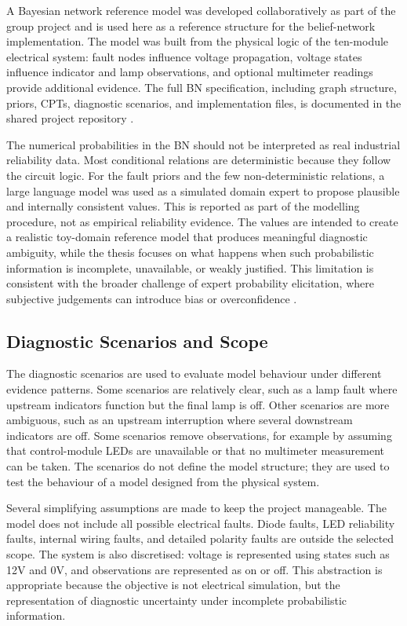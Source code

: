 \documentclass[runningheads]{llncs}
\begin{document}
A Bayesian network reference model was developed collaboratively as part of the group project and is used here as a reference structure for the belief-network implementation. The model was built from the physical logic of the ten-module electrical system: fault nodes influence voltage propagation, voltage states influence indicator and lamp observations, and optional multimeter readings provide additional evidence. The full BN specification, including graph structure, priors, CPTs, diagnostic scenarios, and implementation files, is documented in the shared project repository \cite{BNRepository2026}.

The numerical probabilities in the BN should not be interpreted as real industrial reliability data. Most conditional relations are deterministic because they follow the circuit logic. For the fault priors and the few non-deterministic relations, a large language model was used as a simulated domain expert to propose plausible and internally consistent values. This is reported as part of the modelling procedure, not as empirical reliability evidence. The values are intended to create a realistic toy-domain reference model that produces meaningful diagnostic ambiguity, while the thesis focuses on what happens when such probabilistic information is incomplete, unavailable, or weakly justified. This limitation is consistent with the broader challenge of expert probability elicitation, where subjective judgements can introduce bias or overconfidence \cite{OHagan2006}.

\subsection{Diagnostic Scenarios and Scope}
\label{sec:diagnostic_scenarios_scope}

The diagnostic scenarios are used to evaluate model behaviour under different evidence patterns. Some scenarios are relatively clear, such as a lamp fault where upstream indicators function but the final lamp is off. Other scenarios are more ambiguous, such as an upstream interruption where several downstream indicators are off. Some scenarios remove observations, for example by assuming that control-module LEDs are unavailable or that no multimeter measurement can be taken. The scenarios do not define the model structure; they are used to test the behaviour of a model designed from the physical system.

Several simplifying assumptions are made to keep the project manageable. The model does not include all possible electrical faults. Diode faults, LED reliability faults, internal wiring faults, and detailed polarity faults are outside the selected scope. The system is also discretised: voltage is represented using states such as 12V and 0V, and observations are represented as on or off. This abstraction is appropriate because the objective is not electrical simulation, but the representation of diagnostic uncertainty under incomplete probabilistic information.
\end{document}
